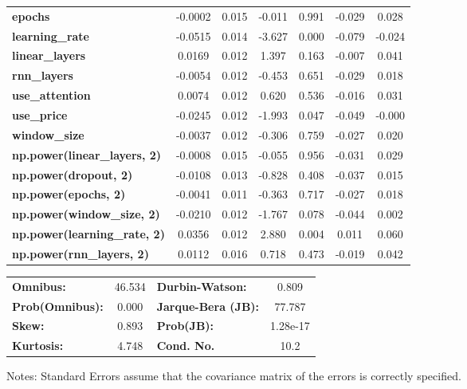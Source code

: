 \begin{center}
\begin{tabular}{lcccccc}
\textbf{epochs}                            &      -0.0002  &        0.015     &    -0.011  &         0.991        &       -0.029    &        0.028     \\
\textbf{learning\_rate}                    &      -0.0515  &        0.014     &    -3.627  &         0.000        &       -0.079    &       -0.024     \\
\textbf{linear\_layers}                    &       0.0169  &        0.012     &     1.397  &         0.163        &       -0.007    &        0.041     \\
\textbf{rnn\_layers}                       &      -0.0054  &        0.012     &    -0.453  &         0.651        &       -0.029    &        0.018     \\
\textbf{use\_attention}                    &       0.0074  &        0.012     &     0.620  &         0.536        &       -0.016    &        0.031     \\
\textbf{use\_price}                        &      -0.0245  &        0.012     &    -1.993  &         0.047        &       -0.049    &       -0.000     \\
\textbf{window\_size}                      &      -0.0037  &        0.012     &    -0.306  &         0.759        &       -0.027    &        0.020     \\
\textbf{np.power(linear\_layers, 2)}       &      -0.0008  &        0.015     &    -0.055  &         0.956        &       -0.031    &        0.029     \\
\textbf{np.power(dropout, 2)}              &      -0.0108  &        0.013     &    -0.828  &         0.408        &       -0.037    &        0.015     \\
\textbf{np.power(epochs, 2)}               &      -0.0041  &        0.011     &    -0.363  &         0.717        &       -0.027    &        0.018     \\
\textbf{np.power(window\_size, 2)}         &      -0.0210  &        0.012     &    -1.767  &         0.078        &       -0.044    &        0.002     \\
\textbf{np.power(learning\_rate, 2)}       &       0.0356  &        0.012     &     2.880  &         0.004        &        0.011    &        0.060     \\
\textbf{np.power(rnn\_layers, 2)}          &       0.0112  &        0.016     &     0.718  &         0.473        &       -0.019    &        0.042     \\
\bottomrule
\end{tabular}
\begin{tabular}{lclc}
\textbf{Omnibus:}       & 46.534 & \textbf{  Durbin-Watson:     } &    0.809  \\
\textbf{Prob(Omnibus):} &  0.000 & \textbf{  Jarque-Bera (JB):  } &   77.787  \\
\textbf{Skew:}          &  0.893 & \textbf{  Prob(JB):          } & 1.28e-17  \\
\textbf{Kurtosis:}      &  4.748 & \textbf{  Cond. No.          } &     10.2  \\
\bottomrule
\end{tabular}
\end{center}

Notes: \newline
 [1] Standard Errors assume that the covariance matrix of the errors is correctly specified.